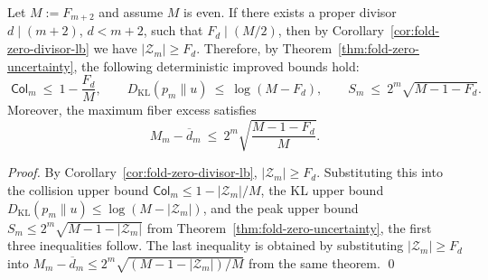 \begin{corollary}\label{cor:fold-zero-divisor-triple-reduction}
Let \(M:=F_{m+2}\) and assume \(M\) is even.
If there exists a proper divisor \(d\mid (m+2)\), \(d<m+2\), such that \(F_d\mid (M/2)\),
then by Corollary~\ref{cor:fold-zero-divisor-lb} we have \(|\mathcal{Z}_m|\ge F_d\).
Therefore, by Theorem~\ref{thm:fold-zero-uncertainty}, the following deterministic improved bounds hold:
\[
\boxed{\;
\mathsf{Col}_m\ \le\ 1-\frac{F_d}{M},\qquad
D_{\mathrm{KL}}(p_m\|u)\ \le\ \log(M-F_d),\qquad
S_m\ \le\ 2^m\sqrt{M-1-F_d}.\;}
\]
Moreover, the maximum fiber excess satisfies
\[
M_m-\overline d_m\ \le\ 2^m\sqrt{\frac{M-1-F_d}{M}}.
\]
\end{corollary}
\begin{proof}
By Corollary~\ref{cor:fold-zero-divisor-lb}, \(|\mathcal{Z}_m|\ge F_d\).
Substituting this into the collision upper bound \(\mathsf{Col}_m\le 1-|\mathcal{Z}_m|/M\),
the KL upper bound \(D_{\mathrm{KL}}(p_m\|u)\le \log(M-|\mathcal{Z}_m|)\),
and the peak upper bound \(S_m\le 2^m\sqrt{M-1-|\mathcal{Z}_m|}\) from Theorem~\ref{thm:fold-zero-uncertainty}, the first three inequalities follow.
The last inequality is obtained by substituting \(|\mathcal{Z}_m|\ge F_d\) into \(M_m-\overline d_m\le 2^m\sqrt{(M-1-|\mathcal{Z}_m|)/M}\) from the same theorem. \qed
\end{proof}

